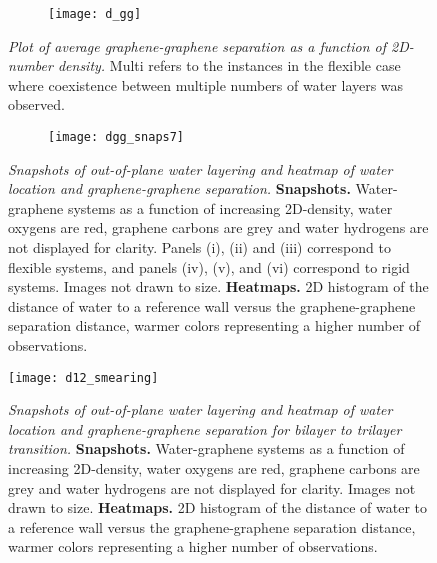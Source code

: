 \documentclass[12pt]{article}
\begin{document}
\begin{figure}[ht!]
	\centering
	\begin{subfigure}[b]{0.39\textwidth}
    		\texttt{[image: d\_gg]}
  	\end{subfigure}
	\caption{\textit{Plot of average graphene-graphene separation as a function of 2D-number density.} Multi refers to the instances in the flexible case where coexistence between multiple numbers of water layers was observed.}
	\label{fig:dgg_1}
\end{figure}

\begin{figure}[ht!]
	\begin{subfigure}[b]{0.99\textwidth}
    		\texttt{[image: dgg\_snaps7]}
  	\end{subfigure}
	\caption{\textit{Snapshots of out-of-plane water layering and heatmap of water location and graphene-graphene separation.} \textbf{Snapshots.} Water-graphene systems as a function of increasing 2D-density, water oxygens are red, graphene carbons are grey and water hydrogens are not displayed for clarity. Panels (i), (ii) and (iii) correspond to flexible systems, and panels (iv), (v), and (vi) correspond to rigid systems. Images not drawn to size. \textbf{Heatmaps.} 2D histogram of the distance of water to a reference wall versus the graphene-graphene separation distance, warmer colors representing a higher number of observations.}
	\label{fig:dgg_2}
\end{figure}

\begin{figure}[ht!]
	\centering
	\texttt{[image: d12\_smearing]} %
	\caption{\textit{Snapshots of out-of-plane water layering and heatmap of water location and graphene-graphene separation for bilayer to trilayer transition.} \textbf{Snapshots.} Water-graphene systems as a function of increasing 2D-density, water oxygens are red, graphene carbons are grey and water hydrogens are not displayed for clarity. Images not drawn to size. \textbf{Heatmaps.} 2D histogram of the distance of water to a reference wall versus the graphene-graphene separation distance, warmer colors representing a higher number of observations.}
	\label{fig:dgg_2_to_3}
\end{figure}


\end{document}
